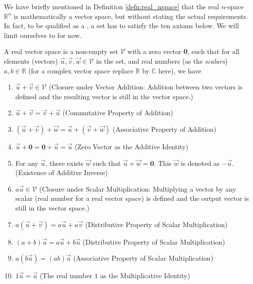 We have briefly mentioned in Definition \ref{defn:real_nspace} that the real $n$-space $\mathbb{R}^n$ is mathematically a vector space, but without stating the actual requirements. In fact, to be qualified as a , a set has to satisfy the ten axioms below. We will limit ourselves to  for now.
\begin{defn}
\label{defn:realvecspaceaxiom}
A real vector space is a non-empty set $\mathcal{V}$ with a zero vector \textbf{0}, such that for all elements (vectors) $\vec{u}, \vec{v}, \vec{w} \in \mathcal{V}$ in the set, and real numbers (as the \textit{scalars}) $a, b \in \mathbb{R}$ (for a complex vector space replace $\mathbb{R}$ by $\mathbb{C}$ here), we have
\begin{enumerate}
\item $\vec{u} + \vec{v} \in \mathcal{V}$ (Closure under Vector Addition: Addition between two vectors is defined and the resulting vector is still in the vector space.)
\item $\vec{u} + \vec{v} = \vec{v} + \vec{u}$ (Commutative Property of Addition)
\item $(\vec{u} + \vec{v}) + \vec{w} = \vec{u} + (\vec{v} + \vec{w})$ (Associative Property of Addition)
\item $\vec{u} + \textbf{0} = \textbf{0} + \vec{u} = \vec{u}$ (Zero Vector as the Additive Identity)
\item For any $\vec{u}$, there exists $\vec{w}$ such that $\vec{u} + \vec{w} = \textbf{0}$. This $\vec{w}$ is denoted as $-\vec{u}$. (Existence of Additive Inverse)
\item $a\vec{u} \in \mathcal{V}$ (Closure under Scalar Multiplication: Multiplying a vector by any scalar (real number for a real vector space) is defined and the output vector is still in the vector space.)
\item $a(\vec{u} + \vec{v}) = a\vec{u} + a\vec{v}$ (Distributive Property of Scalar Multiplication)
\item $(a+b)\vec{u} = a\vec{u} + b\vec{u}$ (Distributive Property of Scalar Multiplication)
\item $a(b\vec{u}) = (ab)\vec{u}$ (Associative Property of Scalar Multiplication)
\item $1\vec{u} = \vec{u}$ (The real number $1$ as the Multiplicative Identity)
\end{enumerate}
\end{defn}
